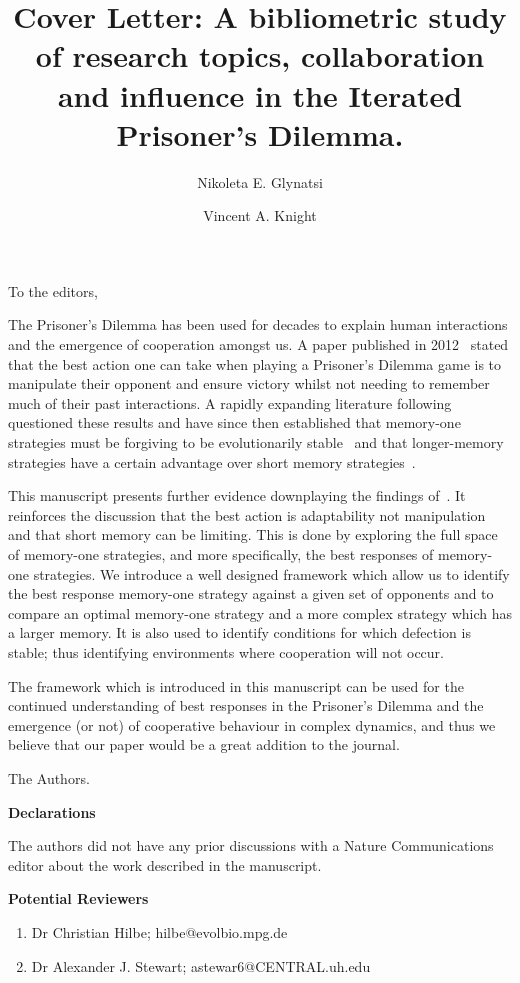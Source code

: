\documentclass{article}
\title{Cover Letter: A bibliometric study of research topics, collaboration and
influence in the Iterated Prisoner’s Dilemma.}
\author[1, *]{Nikoleta E. Glynatsi}
\author[1]{Vincent A. Knight}
\affil[1]{Cardiff University, School of Mathematics, Cardiff, United Kingdom}
\affil[*]{Corresponding author: Nikoleta E. Glynatsi, glynatsine@cardiff.ac.uk}
\date{}
\begin{document}
 
\maketitle

To the editors,
 
The Prisoner's Dilemma has been used for decades to explain human interactions
and the emergence of cooperation amongst us. A paper published in
2012~\cite{Press2012} stated that the best action one can take when playing a
Prisoner's Dilemma game is to manipulate their opponent and ensure victory
whilst not needing to remember much of their past interactions. A rapidly
expanding literature following~\cite{Press2012} questioned these results and
have since then established that memory-one strategies must be forgiving to be
evolutionarily stable~\cite{adami2013} and that longer-memory strategies have
a certain advantage over short memory strategies~\cite{Hilbe2017}.

This manuscript presents further evidence downplaying the findings
of~\cite{Press2012}. It reinforces the discussion that the best action is
adaptability not manipulation and that short memory can be limiting. This is
done by exploring the full space of memory-one strategies, and more specifically, the best
responses of memory-one strategies. We introduce a well designed framework which
allow us to identify the best response memory-one strategy against a given set
of opponents and to compare an optimal memory-one strategy and a more complex
strategy which has a larger memory. It is also used to identify conditions for
which defection is stable; thus identifying environments where cooperation will
not occur.
 
The framework which is introduced in this manuscript can be used for the
continued understanding of best responses in the Prisoner’s Dilemma and the
emergence (or not) of cooperative behaviour in complex dynamics, and thus we
believe that our paper would be a great addition to the journal.
 
The Authors.

\textbf{Declarations}

The authors did not have any prior discussions with a Nature Communications editor
about the work described in the manuscript.

\textbf{Potential Reviewers}

\begin{enumerate}
    \item Dr Christian Hilbe; hilbe@evolbio.mpg.de
    \item Dr Alexander J. Stewart; astewar6@CENTRAL.uh.edu
\end{enumerate}

 


\end{document}
